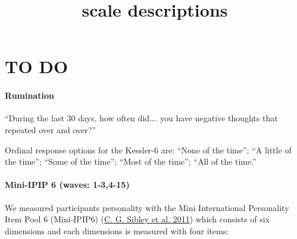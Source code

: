 \documentclass[
  singlecolumn]{report}
\title{scale descriptions}
\author{}
\date{}
\begin{document}
\maketitle
\ifdefined\Shaded\renewenvironment{Shaded}{\begin{tcolorbox}[boxrule=0pt, frame hidden, interior hidden, borderline west={3pt}{0pt}{shadecolor}, enhanced, breakable, sharp corners]}{\end{tcolorbox}}\fi

\listoffigures
\listoftables
\hypertarget{to-do}{%
\chapter{TO DO}\label{to-do}}

\hypertarget{rumination}{%
\subsubsection{Rumination}\label{rumination}}

``During the last 30 days, how often did\ldots. you have negative
thoughts that repeated over and over?''

Ordinal response options for the Kessler-6 are: ``None of the time'';
``A little of the time''; ``Some of the time''; ``Most of the time'';
``All of the time.''

\hypertarget{mini-ipip-6-waves-1-34-15}{%
\subsubsection{Mini-IPIP 6 (waves:
1-3,4-15)}\label{mini-ipip-6-waves-1-34-15}}

We measured participants personality with the Mini International
Personality Item Pool 6 (Mini-IPIP6)
(\protect\hyperlink{ref-sibley2011}{C. G. Sibley et al. 2011}) which
consists of six dimensions and each dimensions is measured with four
items:
\end{document}
